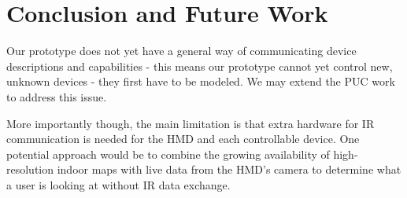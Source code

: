 \section{Conclusion and Future Work}
Our prototype does not yet have a general way of communicating device descriptions and capabilities - this means our prototype cannot yet control new, unknown devices - they first have to be modeled. We may extend the PUC work~\cite{nichols} to address this issue.

More importantly though, the main limitation is that extra hardware for IR communication is needed for the HMD and each controllable device. One potential approach would be to combine the growing availability of high-resolution indoor maps with live data from the HMD's camera to determine what a user is looking at without IR data exchange.

